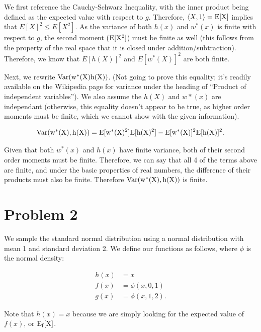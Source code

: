 \documentclass[]{article}
\begin{document}
We first reference the Cauchy-Schwarz Inequality, with the inner product
being defined as the expected value with respect to \(g\). Therefore,
\(\langle X, 1 \rangle = \rm{E}[X]\) implies that \(E[X]^2 \leq E[X^2]\). As
the variance of both \(h(x)\) and \(w^*(x)\) is finite with respect to
\(g\), the second moment (\(\rm{E}[X^2]\)) must be finite as well (this
follows from the property of the real space that it is closed under
addition/subtraction). Therefore, we know that \(E[h(X)]^2\) and
\(E[w^*(X)]^2\) are both finite.

Next, we rewrite \(\rm{Var}(w^*(X)h(X))\). (Not going to prove this
equality; it's readily available on the Wikipedia page for variance
under the heading of ``Product of independent variables''). We also
assume the \(h(X)\) and \(w*(x)\) are independant (otherwise, this
equality doesn't appear to be true, as higher order moments must be
finite, which we cannot show with the given information).

\begin{align*}
\rm{Var}(w^*(X), h(X)) = \rm{E}[w^*(X)^2]\rm{E}[h(X)^2] - \rm{E}[w^*(X)]^2\rm{E}[h(X)]^2.
\end{align*}

Given that both \(w^*(x)\) and \(h(x)\) have finite variance, both of
their second order moments must be finite. Therefore, we can say that
all 4 of the terms above are finite, and under the basic properties of
real numbers, the difference of their products must also be finite.
Therefore \(\rm{Var}(w^*(X), h(X))\) is finite.

\section{Problem 2}\label{problem-2}

We sample the standard normal distribution using a normal distribution
with mean 1 and standard deviation 2. We define our functions as
follows, where \(\phi\) is the normal density:

\begin{align*}
h(x) &= x \\
f(x) &= \phi(x, 0, 1) \\
g(x) &= \phi(x, 1, 2).
\end{align*}

Note that \(h(x)=x\) because we are simply looking for the expected
value of \(f(x)\), or \(\rm{E}_f[X]\).
\end{document}
